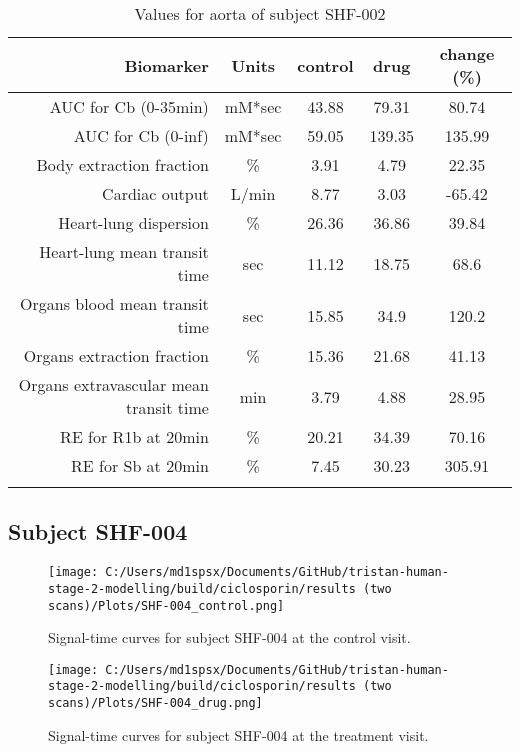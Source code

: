 \documentclass{epflreport}%
\begin{document}
\begin{longtable}{rcccc}%
\hline%
Biomarker&Units&control&drug&change (\%)\\%
\hline%
AUC for Cb (0{-}35min)&mM*sec&43.88&79.31&80.74\\%
AUC for Cb (0{-}inf)&mM*sec&59.05&139.35&135.99\\%
Body extraction fraction&\%&3.91&4.79&22.35\\%
Cardiac output&L/min&8.77&3.03&{-}65.42\\%
Heart{-}lung dispersion&\%&26.36&36.86&39.84\\%
Heart{-}lung mean transit time&sec&11.12&18.75&68.6\\%
Organs blood mean transit time&sec&15.85&34.9&120.2\\%
Organs extraction fraction&\%&15.36&21.68&41.13\\%
Organs extravascular mean transit time&min&3.79&4.88&28.95\\%
RE for R1b at 20min&\%&20.21&34.39&70.16\\%
RE for Sb at 20min&\%&7.45&30.23&305.91\\%
\hline%
\caption{Values for aorta of subject SHF-002} \\%
\end{longtable}%
\clearpage%
\subsection{Subject SHF{-}004}%
\label{subsec:SubjectSHF{-}004}%

%


\begin{figure}[h!]%
\centering%
\texttt{[image: C:/Users/md1spsx/Documents/GitHub/tristan-human-stage-2-modelling/build/ciclosporin/results (two scans)/Plots/SHF-004\_control.png]}%
\caption{Signal{-}time curves for subject SHF{-}004 at the control visit.}%
\end{figure}

%


\begin{figure}[h!]%
\centering%
\texttt{[image: C:/Users/md1spsx/Documents/GitHub/tristan-human-stage-2-modelling/build/ciclosporin/results (two scans)/Plots/SHF-004\_drug.png]}%
\caption{Signal{-}time curves for subject SHF{-}004 at the treatment visit.}%
\end{figure}
\end{document}
